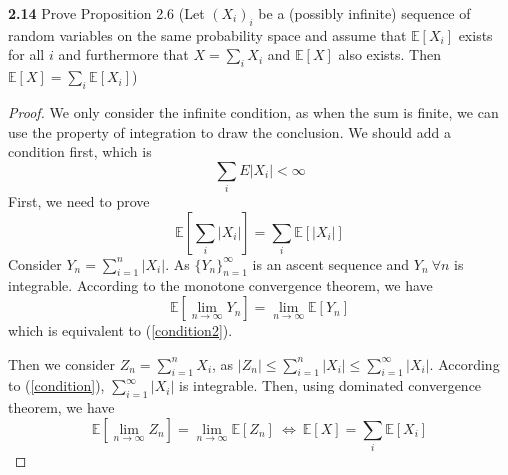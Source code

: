 \noindent\textbf{2.14} Prove Proposition 2.6 (Let $(X_i)_i$ be a (possibly infinite) sequence of random variables on the same probability space and assume that $\mathbb{E}[X_i]$ exists for all $i$ and furthermore that $X = \sum_i X_i$ and $\mathbb{E}[X]$ also exists. Then $\mathbb{E}[X] = \sum_i\mathbb{E}[X_i]$) 
\begin{proof}
    We only consider the infinite condition, as when the sum is finite, we can use the property of integration to draw the conclusion. 
    We should add a condition first, which is 
    \begin{equation}
        \label{condition}
        \sum_i E|X_i|< \infty
    \end{equation}
    First, we need to prove 
    \begin{equation}
        \label{condition2}
        \mathbb{E} [\sum_i |X_i|] = \sum_i\mathbb{E}[|X_i|]
    \end{equation}
    Consider $Y_n = \sum_{i = 1}^n|X_i|$. As $\{Y_n\}_{n=1}^\infty$ is an ascent sequence and $Y_n\ \forall n$ is integrable. According to the monotone convergence theorem, we have 
    \begin{equation}
        \mathbb{E}[\lim_{n\to \infty} Y_n] = \lim_{n\to \infty} \mathbb{E}[Y_n] 
    \end{equation}
    which is equivalent to (\ref{condition2}).

    Then we consider $Z_n = \sum_{i=1}^n X_i$, as $|Z_n|\leq \sum_{i=1}^n |X_i|\leq \sum_{i = 1}^\infty |X_i|$. According to (\ref{condition}), $\sum_{i = 1}^\infty |X_i|$ is integrable. Then, using dominated convergence theorem, we have 
    \begin{equation}
        \mathbb{E}[\lim_{n\to \infty} Z_n] = \lim_{n\to \infty} \mathbb{E}[Z_n] \ \Longleftrightarrow\ \mathbb{E}[X] = \sum_i\mathbb{E}[X_i]
    \end{equation}
\end{proof}
\iffalse
